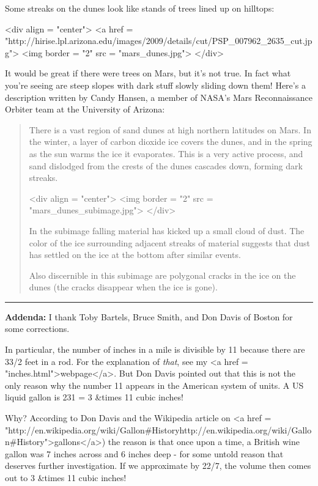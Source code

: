Some streaks on the dunes look like stands of trees lined up on hilltops: 

<div align = "center">
<a href = "http://hirise.lpl.arizona.edu/images/2009/details/cut/PSP_007962_2635_cut.jpg">
<img border = "2" src = "mars_dunes.jpg">
</div>

It would be great if there were trees on Mars, but it's not true.  In
fact what you're seeing are steep slopes with dark stuff slowly
sliding down them!  Here's a description written by Candy Hansen, a
member of NASA's Mars Reconnaissance Orbiter team at the University of
Arizona:

\begin{quote}

There is a vast region of sand dunes at high northern latitudes on
Mars. In the winter, a layer of carbon dioxide ice covers the dunes,
and in the spring as the sun warms the ice it evaporates. This is a
very active process, and sand dislodged from the crests of the dunes
cascades down, forming dark streaks.

<div align = "center">
<img border = "2" src = "mars_dunes_subimage.jpg">
</div>

In the subimage falling material has kicked up a small cloud of
dust. The color of the ice surrounding adjacent streaks of material
suggests that dust has settled on the ice at the bottom after similar
events.

Also discernible in this subimage are polygonal cracks in the ice on
the dunes (the cracks disappear when the ice is gone).

\end{quote}

\par\noindent\rule{\textwidth}{0.4pt}
\textbf{Addenda:} I thank Toby Bartels, Bruce Smith, and Don Davis of
Boston for some corrections.

In particular, the number of inches in a mile is divisible by 11
because there are 33/2 feet in a rod.  For the explanation of
\emph{that}, see my <a href = "inches.html">webpage</a>.  But Don
Davis pointed out that this is not the only reason why the number 11
appears in the American system of units.  A US liquid gallon is 231 =
3  &times 11 cubic inches!

Why?  According to Don Davis and the Wikipedia article on <a href =
"http://en.wikipedia.org/wiki/Gallon#Historyhttp://en.wikipedia.org/wiki/Gallon#History">gallons</a>)
the reason is that once upon a time, a British wine gallon was 7
inches across and 6 inches deep - for some untold reason that deserves
further investigation.  If we approximate \pi  by 22/7, the volume
then comes out to 3  &times 11 cubic inches!

